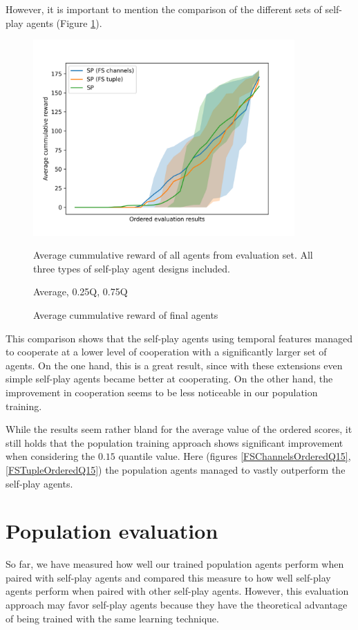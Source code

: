 However, it is important to mention the comparison of the different sets of self-play agents (Figure \ref{FSVariantsOrderedAvg}).
\begin{figure}[!ht]
    \centering
    \includegraphics*[width=10cm]{../img/FSVariantsOrderedAvg.png}

    \caption{Average cummulative reward of final agents}
    \label{FSVariantsOrderedAvg}
    \medskip
    \small 
    Average cummulative reward of all agents from evaluation set.
    All three types of self-play agent designs included.

    Average, 0.25Q, 0.75Q

\end{figure}
This comparison shows that the self-play agents using temporal features managed to cooperate at a lower level of cooperation with a significantly larger set of agents.
On the one hand, this is a great result, since with these extensions even simple self-play agents became better at cooperating.
On the other hand, the improvement in cooperation seems to be less noticeable in our population training.

While the results seem rather bland for the average value of the ordered scores, it still holds that the population training approach shows significant improvement when considering the $0.15$ quantile value.
Here (figures \ref{FSChannelsOrderedQ15}, \ref{FSTupleOrderedQ15}) the population agents managed to vastly outperform the self-play agents.



\section{Population evaluation}
So far, we have measured how well our trained population agents perform when paired with self-play agents and compared this measure to how well self-play agents perform when paired with other self-play agents.
However, this evaluation approach may favor self-play agents because they have the theoretical advantage of being trained with the same learning technique.

